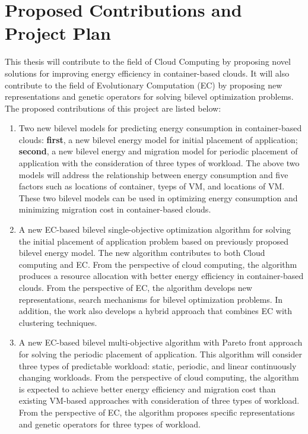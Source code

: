 \chapter{Proposed Contributions and Project Plan}\label{C:con}

This thesis will contribute to the field of Cloud Computing by proposing novel solutions for improving energy efficiency in container-based clouds. It will also contribute to the field of Evolutionary Computation (EC) by proposing new representations and genetic operators for solving bilevel optimization problems. The proposed contributions of this project are listed below:
 
\begin{enumerate}
	\item Two new bilevel models for predicting energy consumption in container-based clouds: \textbf{first}, a new bilevel energy model for initial placement of application; \textbf{second}, a new bilevel energy and migration model for periodic placement of application with the consideration of three types of workload. The above two models will address the relationship between energy consumption and five factors such as locations of container, tyeps of VM, and locations of VM.  
	These two bilevel models can be used in optimizing energy consumption and minimizing migration cost in container-based clouds.

	\item A new EC-based bilevel single-objective optimization algorithm for solving the initial placement of application problem based on previously proposed bilevel energy model. The new algorithm contributes to both Cloud computing and EC. From the perspective of cloud computing, the algorithm produces a resource allocation with better energy efficiency in container-based clouds. From the perspective of EC, the algorithm develops new representations, search mechanisms for bilevel optimization problems. In addition, the work also develops a hybrid approach that combines EC with clustering techniques.

	\item A new EC-based bilevel multi-objective algorithm with Pareto front approach for solving the periodic placement of application. This algorithm will consider three types of predictable workload: static, periodic, and linear continuously changing workloads. From the perspective of cloud computing, the algorithm is expected to achieve better energy efficiency and migration cost than existing VM-based approaches with consideration of three types of workload. From the perspective of EC, the algorithm proposes specific representations and genetic operators for three types of workload. 


\end{enumerate}

